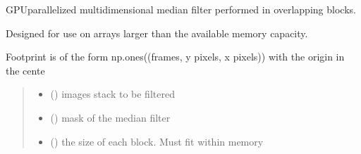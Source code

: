 \documentclass[letterpaper,10pt,english]{sphinxmanual}
\begin{document}
\begin{fulllineitems}
\label{\detokenize{CalSciPy.image_processing:CalSciPy.image_processing.blockwise_fast_filter_tiff}}
\pysigstartsignatures
{}
\pysigstopsignatures
\sphinxAtStartPar
GPU\sphinxhyphen{}parallelized multidimensional median filter performed in overlapping blocks.

\sphinxAtStartPar
Designed for use on arrays larger than the available memory capacity.

\sphinxAtStartPar
Footprint is of the form np.ones((frames, y pixels, x pixels)) with the origin in the cente
\begin{quote}\begin{description}
\begin{itemize}
\item {} 
\sphinxAtStartPar
{} () \sphinxhyphen{}\sphinxhyphen{} images stack to be filtered

\item {} 
\sphinxAtStartPar
{} (\sphinxstyleliteralemphasis{\sphinxupquote{(}}\sphinxstyleliteralemphasis{\sphinxupquote{(}}\sphinxstyleliteralemphasis{\sphinxupquote{, }}\sphinxstyleliteralemphasis{\sphinxupquote{, }}\sphinxstyleliteralemphasis{\sphinxupquote{)}}\sphinxstyleliteralemphasis{\sphinxupquote{)}}) \sphinxhyphen{}\sphinxhyphen{} mask of the median filter

\item {} 
\sphinxAtStartPar
{} () \sphinxhyphen{}\sphinxhyphen{} the size of each block. Must fit within memory


\end{itemize}
\end{description}
\end{quote}
\end{fulllineitems}
\end{document}
